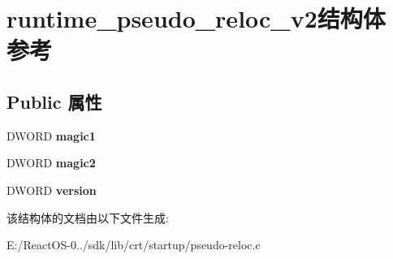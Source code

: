 \hypertarget{structruntime__pseudo__reloc__v2}{}\section{runtime\+\_\+pseudo\+\_\+reloc\+\_\+v2结构体 参考}
\label{structruntime__pseudo__reloc__v2}
\subsection*{Public 属性}
\begin{DoxyCompactItemize}
\item 
\mbox{\label{structruntime__pseudo__reloc__v2_acdc620199739e233e3c969000641a854}} 
D\+W\+O\+RD {\bfseries magic1}
\item 
\mbox{\label{structruntime__pseudo__reloc__v2_a31be23c45ea1153ef15b67bedcc7c163}} 
D\+W\+O\+RD {\bfseries magic2}
\item 
\mbox{\label{structruntime__pseudo__reloc__v2_a498934198b66d696d8aa30f5cb7fb821}} 
D\+W\+O\+RD {\bfseries version}
\end{DoxyCompactItemize}


该结构体的文档由以下文件生成\+:\begin{DoxyCompactItemize}
\item 
E\+:/\+React\+O\+S-\/0../sdk/lib/crt/startup/pseudo-\/reloc.\+c\end{DoxyCompactItemize}
